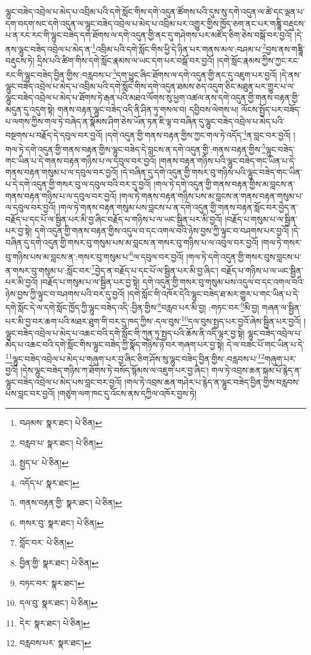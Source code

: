 ལྷུང་བཟེད་འབྲེལ་པ་མེད་པ་འབྲིམ་པའི་དགེ་སློང་གིས་དགེ་འདུན་ཚོགས་པའི་དུས་སུ་དགེ་འདུན་ལ་ཚེ་དང་ལྡན་པ་དག་བདག་སང་དགེ་འདུན་ལ་ལྷུང་བཟེད་འབྲེལ་པ་མེད་པ་འབྲིམ་པར་འགྱུར་གྱིས་ཁྱོད་ཅག་ནང་པར་གཎྜཱི་བརྡུངས་པ་ན་རང་རང་གི་ལྷུང་བཟེད་དག་ཐོགས་ལ་དགེ་འདུན་གྱི་ནང་དུ་གཤེགས་པར་མཛོད་ཅིག་ཅེས་བསྒོ་བར་བྱའོ། །དེ་ནས་ལྷུང་བཟེད་འབྲེལ་པ་མེད་ན་\footnote{བཤམས་  སྣར་ཐང་།  པེ་ཅིན། }འབྲིམ་པའི་དགེ་སློང་གིས་ཕྱི་དེ་ཉིན་པར་གནས་མལ་:བཤམ་པ་\footnote{བརླབ་པ་  སྣར་ཐང་།  པེ་ཅིན། }བྱས་ནས་གཎྜཱི་བརྡུངས་ཏེ། དྲིས་པའི་ཚིག་གིས་དགེ་སློང་རྣམས་ལ་ཡང་དག་པར་བསྒོ་བར་བྱའོ། །དགེ་སློང་རྣམས་ཀྱིས་ཀྱང་རང་རང་གི་ལྷུང་བཟེད་བྱིན་གྱིས་:བརླབས་པ་\footnote{སྤྱད་པ་  པེ་ཅིན། }དག་ཕྱུང་ཞིང་ཐོགས་ལ་དགེ་འདུན་གྱི་ནང་དུ་འཇུག་པར་བྱའོ། །དེ་ནས་ལྷུང་བཟེད་འབྲེལ་པ་མེད་པ་འབྲིམ་པའི་དགེ་སློང་གིས་དགེ་འདུན་ཐམས་ཅད་འདུག་ཅིང་མཐུན་པར་གྱུར་པ་ལ་ལྷུང་བཟེད་འབྲེལ་པ་མེད་པ་ཐོགས་ཏེ་རྒན་པའི་མཐའ་ལོགས་སུ་ཕྱག་འཚལ་ནས་དགེ་འདུན་གྱི་གནས་བརྟན་གྱི་མདུན་དུ་འདུག་སྟེ། གནས་བརྟན་ལྷུང་བཟེད་འདི་ནི་ཤིན་ཏུ་གསལ་བ། དབྱིབས་ལེགས་པ། ལོངས་སྤྱོད་པར་བཟོད་པ་ལགས་ཀྱིས་གལ་ཏེ་བཞེད་ན་སྣོམས་ཤིག་ཅེས་ཡོན་ཏན་ཇི་ལྟ་བ་བཞིན་དུ་ལྷུང་བཟེད་འབྲེལ་པ་མེད་པའི་བསྔགས་པ་བརྗོད་དེ་དབུལ་བར་བྱའོ། །དགེ་འདུན་གྱི་གནས་བརྟན་གྱིས་ཀྱང་གལ་ཏེ་འདོད་\footnote{འདོད་པ་  སྣར་ཐང་། }ན་བླང་བར་བྱའོ། །གལ་ཏེ་དགེ་འདུན་གྱི་གནས་བརྟན་གྱིས་ལྷུང་བཟེད་དེ་བླངས་ན་དགེ་འདུན་གྱི་:གནས་བརྟན་གྱིས་\footnote{གནས་བརྟན་གྱི་  སྣར་ཐང་།  པེ་ཅིན། }ལྷུང་བཟེད་གང་ཡིན་པ་དེ་གནས་བརྟན་གཉིས་པ་ལ་དབུལ་བར་བྱའོ། །གནས་བརྟན་གཉིས་པའི་ལྷུང་བཟེད་གང་ཡིན་པ་དེ་གནས་བརྟན་གསུམ་པ་ལ་དབུལ་བར་བྱའོ། །དེ་བཞིན་དུ་དགེ་འདུན་གྱི་གསར་བུ་གཉིས་པའི་ལྷུང་བཟེད་གང་ཡིན་པ་དེ་དགེ་འདུན་གྱི་གསར་བུ་ལ་དབུལ་བའི་བར་དུ་བྱའོ། །གལ་ཏེ་དགེ་འདུན་གྱི་གནས་བརྟན་གྱིས་མ་བླངས་ན་གནས་བརྟན་གཉིས་པ་ལ་དབུལ་བར་བྱའོ། །གལ་ཏེ་གནས་བརྟན་གཉིས་པས་མ་བླངས་ན་གནས་བརྟན་གསུམ་པ་ལ་དབུལ་བར་བྱའོ། །གལ་ཏེ་གནས་བརྟན་གསུམ་པས་བླངས་པ་ན་དགེ་འདུན་གྱི་གནས་བརྟན་སློང་བར་བྱེད་ན་བརྗོད་པ་དང་པོ་ལ་སྦྱིན་པར་མི་བྱ་ཞིང་བརྗོད་པ་གཉིས་པ་ལ་ཡང་སྦྱིན་པར་མི་བྱའོ། །བརྗོད་པ་གསུམ་པ་ལ་སྦྱིན་པར་བྱ་སྟེ། དགེ་འདུན་གྱི་གནས་བརྟན་གྱིས་འདུལ་བ་དང་འགལ་བའི་ཉེས་བྱས་ཀྱི་ལྟུང་བ་བཤགས་པར་བྱའོ། །དེ་བཞིན་དུ་དགེ་འདུན་གྱི་གསར་བུ་གསུམ་པས་མ་བླངས་ན་གསར་བུ་གཉིས་པ་ལ་འབུལ་བར་བྱའོ། །གལ་ཏེ་གསར་བུ་གཉིས་པས་མ་བླངས་ན་:གསར་བུ་གསུམ་པ་\footnote{གསར་བུ་  སྣར་ཐང་།  པེ་ཅིན། }ལ་དབུལ་བར་བྱའོ། །གལ་ཏེ་དགེ་འདུན་གྱི་གསར་བུས་བླངས་པ་ན་གསར་བུ་གསུམ་པ་:སློང་བར་\footnote{བློང་བར་  པེ་ཅིན། }བྱེད་ན་བརྗོད་པ་དང་པོ་ལ་སྦྱིན་པར་མི་བྱ་ཞིང་། བརྗོད་པ་གཉིས་པ་ལ་ཡང་སྦྱིན་པར་མི་བྱའོ། །བརྗོད་པ་གསུམ་པ་ལ་སྦྱིན་པར་བྱ་སྟེ། དགེ་འདུན་གྱི་གསར་བུ་གསུམ་པས་འདུལ་བ་དང་འགལ་བའི་ཉེས་བྱས་ཀྱི་ལྟུང་བ་བཤགས་པའི་བར་དུ་བྱའོ། །དགེ་སློང་གི་འཁོར་དེའི་ལྷུང་བཟེད་ཐ་མར་གྱུར་པ་གང་ཡིན་པ་དེ་དགེ་སློང་དེ་ལ་དགེ་སློང་ཁྱོད་ཀྱི་ལྷུང་བཟེད་འདི་:བྱིན་གྱིས་\footnote{བྱིན་གྱི་  སྣར་ཐང་།  པེ་ཅིན། }བརླབ་པར་མི་བྱ། :གཏང་བར་\footnote{བཏང་བར་  སྣར་ཐང་། }མི་བྱ། གཞན་ལ་སྦྱིན་པར་མི་བྱ་བར་ཆག་པའི་མཐར་ཐུག་གི་བར་དུ་ཁད་ཀྱིས་:དལ་བུས་\footnote{དལ་བུ་  སྣར་ཐང་།  པེ་ཅིན། }དལ་བུས་སྤྱད་པར་བྱའོ་ཞེས་སྦྱིན་པར་བྱའོ། །ལྷུང་བཟེད་འབྲེལ་པ་མེད་པ་འཆང་བའི་དགེ་སློང་གི་ཀུན་ཏུ་སྤྱད་པའི་ཆོས་ནི་འདི་ལྟར་བྱ་སྟེ། ལྷུང་བཟེད་འབྲེལ་པ་མེད་པ་འཆང་བའི་དགེ་སློང་གིས་ལྷུང་བཟེད་ཀྱི་སྣོད་གཉིས་ཉེ་བར་གཞག་པར་བྱ་སྟེ། དེ་ལ་བཟང་པོ་གང་ཡིན་པ་དེ་\footnote{དེར་  སྣར་ཐང་།  པེ་ཅིན། }ལྷུང་བཟེད་འབྲེལ་པ་མེད་པ་གཞུག་པར་བྱ་ཞིང་ཅིག་ཤོས་སུ་ལྷུང་བཟེད་བྱིན་གྱིས་:བརླབས་པ་\footnote{བརླབས་པར་  སྣར་ཐང་། }གཞུག་པར་བྱའོ། །དེས་ལྷུང་བཟེད་གཉིས་ཀ་ཐོགས་ཏེ་བསོད་སྙོམས་ལ་འཇུག་པར་བྱ་ཞིང་། གལ་ཏེ་འབྲས་ཆན་སྐམ་པོ་རྙེད་ན་ལྷུང་བཟེད་འབྲེལ་པ་མེད་པས་བླང་བར་བྱའོ། །གལ་ཏེ་འབྲས་ཆན་གཤེར་པ་རྙེད་ན་ལྷུང་བཟེད་བྱིན་གྱིས་བརླབས་པས་བླང་བར་བྱའོ། །གཙུག་ལག་ཁང་དུ་འོངས་ནས་དཀྱིལ་འཁོར་བྱས་ཏེ། 